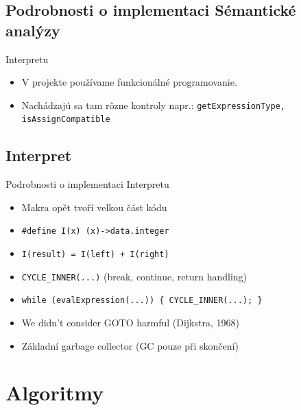 \documentclass[13pt]{beamer}
\begin{document}
\subsection{Podrobnosti o implementaci Sémantické analýzy}

\begin{frame}{Interpretu}
  \begin{itemize}
    \item V projekte používame funkcionálné programovanie.
    \item Nachádzajú sa tam rôzne kontroly napr.: \texttt{getExpressionType, isAssignCompatible}
  \end{itemize}
\end{frame}

\subsection{Interpret}

\begin{frame}{Podrobnosti o implementaci Interpretu}


  \begin{itemize}
    \item Makra opět tvoří velkou část kódu
    \item \texttt{\#define I(x) (x)->data.integer}
    \item \texttt{I(result) = I(left) + I(right)}
    \item \texttt{CYCLE\_INNER(...)} (break, continue, return handling)
    \item \texttt{while (evalExpression(...)) \{ CYCLE\_INNER(...); \}}
    \item We didn't consider GOTO harmful (Dijkstra, 1968)
    \item Základní garbage collector (GC pouze při skončení)
  \end{itemize}
\end{frame}

\section{Algoritmy}
\end{document}
